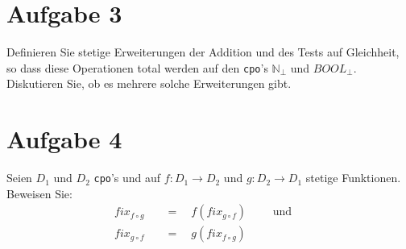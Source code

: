 \documentclass[ngerman,a4paper]{report}
\begin{document}
\section*{Aufgabe 3}
Definieren Sie stetige Erweiterungen der Addition und des Tests auf Gleichheit, so dass diese Operationen total werden auf den \lstinline!cpo!'s $\mathbb{N}_\bot$ und $BOOL_\bot$. Diskutieren Sie, ob es mehrere solche Erweiterungen gibt.\\
\section*{Aufgabe 4}
Seien $D_1$ und $D_2$ \lstinline!cpo!'s und auf $f:D_1\rightarrow D_2$ und $g:D_2 \rightarrow D_1$ stetige Funktionen.\\
Beweisen Sie:\\
\begin{align*}
	fix_{f\circ g}\quad &= \quad f(fix_{g \circ f}) \quad\quad \text{ und }\\
	fix_{g\circ f}\quad &= \quad g(fix_{f\circ g}) &\\
\end{align*}
\end{document}
